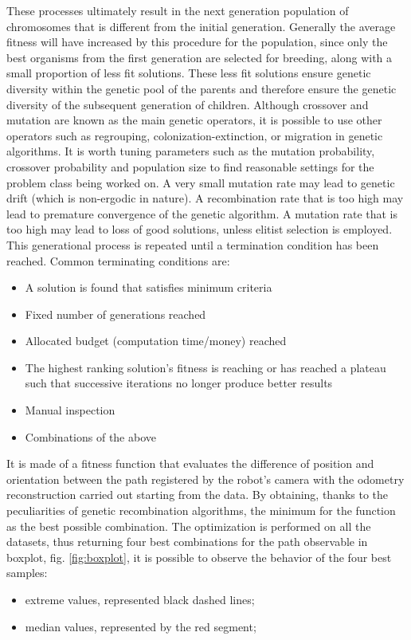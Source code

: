 These processes ultimately result in the next generation population of chromosomes that is different from the initial generation. Generally the average fitness will have increased by this procedure for the population, since only the best organisms from the first generation are selected for breeding, along with a small proportion of less fit solutions. These less fit solutions ensure genetic diversity within the genetic pool of the parents and therefore ensure the genetic diversity of the subsequent generation of children.
Although crossover and mutation are known as the main genetic operators, it is possible to use other operators such as regrouping, colonization-extinction, or migration in genetic algorithms.
It is worth tuning parameters such as the mutation probability, crossover probability and population size to find reasonable settings for the problem class being worked on. A very small mutation rate may lead to genetic drift (which is non-ergodic in nature). A recombination rate that is too high may lead to premature convergence of the genetic algorithm. A mutation rate that is too high may lead to loss of good solutions, unless elitist selection is employed.
This generational process is repeated until a termination condition has been reached. Common terminating conditions are:
\begin{itemize}
\item A solution is found that satisfies minimum criteria
\item Fixed number of generations reached
\item Allocated budget (computation time/money) reached
\item The highest ranking solution's fitness is reaching or has reached a plateau such that successive iterations no longer produce better results
\item Manual inspection
\item Combinations of the above
\end{itemize}
\noindent It is made of a fitness function that evaluates the difference of position and orientation between the path registered by the robot's camera with the odometry reconstruction carried out starting from the data. By obtaining, thanks to the peculiarities of genetic recombination algorithms, the minimum for the function as the best possible combination.
The optimization is performed on all the datasets, thus returning four best combinations for the path observable in boxplot, fig. \ref{fig:boxplot}, it is possible to observe the behavior of the four best samples:
\begin{itemize}
\item extreme values, represented black dashed lines;
\item median values, represented by the red segment;
\end{itemize}
